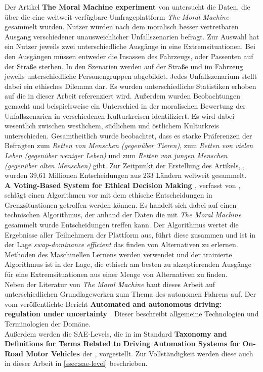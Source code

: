 Der Artikel \textbf{The Moral Machine experiment \cite{moralMachine}} von \citeauthor{moralMachine} untersucht die Daten, die über die eine weltweit verfügbare Umfrageplattform \textit{The Moral Machine} gesammelt wurden. Nutzer wurden nach dem moralisch besser vertretbaren Ausgang verschiedener unausweichlicher Unfallszenarien befragt. Zur Auswahl hat ein Nutzer jeweils zwei unterschiedliche Ausgänge in eine Extremsituationen. Bei den Ausgängen müssen entweder die Insassen des Fahrzeugs, oder Passenten auf der Straße sterben. In den Szenarien werden auf der Straße und im Fahrzeug jeweils unterschiedliche Personengruppen abgebildet. Jedes Unfallszenarium stellt dabei ein ethisches Dilemma dar. Es wurden unterschiedliche Statistiken erhoben auf die in dieser Arbeit referenziert wird. Außerdem wurden Beobachtungen gemacht und beispielsweise ein Unterschied in der moralischen Bewertung der Unfallszenarien in verschiedenen Kulturkreisen identifiziert. Es wird dabei wesentlich zwischen westlichem, südlichem und östlichem Kulturkreis unterschieden. Gesamtheitlich wurde beobachtet, dass es starke Präferenzen der Befragten zum \textit{Retten von Menschen (gegenüber Tieren)}, zum \textit{Retten von vielen Leben (gegenüber weniger Leben)} und zum \textit{Retten von jungen Menschen (gegenüber alten Menschen)} gibt. Zur Zeitpunkt der Erstellung des Artikels, \citeyear{moralMachine}, wurden 39,61 Millionen Entscheidungen aus 233 Ländern weltweit gesammelt. \\

\textbf{A Voting-Based System for Ethical Decision Making \cite{votingBasedSystem}}, verfasst von \citeauthor{votingBasedSystem}, schlägt einen Algorithmen vor mit dem ethische Entscheidungen in Grenzsituationen getroffen werden können. Es handelt sich dabei auf einen technischen Algorithmus, der anhand der Daten die mit \textit{The Moral Machine} gesammelt wurde Entscheidungen treffen kann. Der Algorithmus wertet die Ergebnisse aller Teilnehmern der Plattform aus, führt diese zusammen und ist in der Lage  \textit{swap-dominance efficient} das finden von Alternativen zu erlernen. Methoden des Maschinellen Lernens werden verwendet und der trainierte Algorithmus ist in der Lage, die ethisch am besten zu akzeptierenden Ausgänge für eine Extremsituationen aus einer Menge von Alternativen zu finden.\\

Neben der Literatur von \textit{The Moral Machine} baut dieses Arbeit auf unterschiedlichen Grundlagewerken zum Thema des autonomen Fahrens auf. Der vom \citeauthor{smith2015automated} veröffentlichte Bericht \textbf{Automated and
autonomous driving: regulation under uncertainty \cite{smith2015automated}}. Dieser beschreibt allgemeine Technologien und Terminologien der Domäne.\\

Außerdem werden die SAE-Levels, die in im Standard \textbf{Taxonomy and Definitions for Terms Related to Driving Automation Systems for On-Road Motor Vehicles \cite{standardSAE}} der \citeauthor{standardSAE}, vorgestellt. Zur Vollständigkeit werden diese auch in dieser Arbeit in \ref{ssec:sae-level} beschrieben.\\